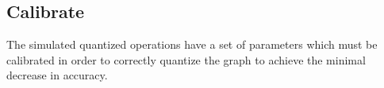 

\subsection{Calibrate}
The simulated quantized operations have a set of parameters which must
  be calibrated in order to correctly quantize the graph to achieve the
  minimal decrease in accuracy.

